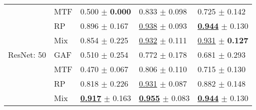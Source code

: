 \begin{tabular}[t]{lllll}
 & MTF & \textcolor[rgb]{0.9322033898,0.0677966102,0}{0.500} $\pm$ \textbf{\textcolor[rgb]{0.0000000000,0.5000000000,0}{0.000}} & \textcolor[rgb]{0.6654804270,0.3345195730,0}{0.833} $\pm$ \textcolor[rgb]{0.2351321773,0.5000000000,0}{0.098} & \textcolor[rgb]{0.8315789474,0.1684210526,0}{0.725} $\pm$ \textcolor[rgb]{0.0883980035,0.5000000000,0}{0.142} \\
 & RP & \textcolor[rgb]{0.0466101695,0.5000000000,0}{0.896} $\pm$ \textcolor[rgb]{0.6276652573,0.3723347427,0}{0.167} & \underline{\textcolor[rgb]{0.0913404508,0.5000000000,0}{0.938}} $\pm$ \textcolor[rgb]{0.1787248165,0.5000000000,0}{0.093} & \underline{\textbf{\textcolor[rgb]{0.0000000000,0.5000000000,0}{0.944}}} $\pm$ \textcolor[rgb]{0.0148524795,0.5000000000,0}{0.130} \\
 & Mix & \textcolor[rgb]{0.1398305085,0.5000000000,0}{0.854} $\pm$ \textcolor[rgb]{0.8452671150,0.1547328850,0}{0.225} & \underline{\textcolor[rgb]{0.1261368130,0.5000000000,0}{0.932}} $\pm$ \textcolor[rgb]{0.3579032134,0.5000000000,0}{0.111} & \underline{\textcolor[rgb]{0.0526315789,0.5000000000,0}{0.931}} $\pm$ \textbf{\textcolor[rgb]{0.0000000000,0.5000000000,0}{0.127}} \\
ResNet: 50 & GAF & \textcolor[rgb]{0.9104519774,0.0895480226,0}{0.510} $\pm$ \textcolor[rgb]{0.9520028121,0.0479971879,0}{0.254} & \textcolor[rgb]{1.0000000000,0.0000000000,0}{0.772} $\pm$ \textcolor[rgb]{1.0000000000,0.0000000000,0}{0.178} & \textcolor[rgb]{1.0000000000,0.0000000000,0}{0.681} $\pm$ \textcolor[rgb]{1.0000000000,0.0000000000,0}{0.293} \\
 & MTF & \textcolor[rgb]{1.0000000000,0.0000000000,0}{0.470} $\pm$ \textcolor[rgb]{0.2531848418,0.5000000000,0}{0.067} & \textcolor[rgb]{0.8177145117,0.1822854883,0}{0.806} $\pm$ \textcolor[rgb]{0.3482819482,0.5000000000,0}{0.110} & \textcolor[rgb]{0.8684210526,0.1315789474,0}{0.715} $\pm$ \textcolor[rgb]{0.0185218762,0.5000000000,0}{0.130} \\
 & RP & \textcolor[rgb]{0.2203389831,0.5000000000,0}{0.818} $\pm$ \textcolor[rgb]{0.8492077756,0.1507922244,0}{0.226} & \underline{\textcolor[rgb]{0.1304863582,0.5000000000,0}{0.931}} $\pm$ \textcolor[rgb]{0.1279698108,0.5000000000,0}{0.087} & \textcolor[rgb]{0.2368421053,0.5000000000,0}{0.882} $\pm$ \textcolor[rgb]{0.1280590346,0.5000000000,0}{0.148} \\
 & Mix & \underline{\textbf{\textcolor[rgb]{0.0000000000,0.5000000000,0}{0.917}}} $\pm$ \textcolor[rgb]{0.6114994881,0.3885005119,0}{0.163} & \underline{\textbf{\textcolor[rgb]{0.0000000000,0.5000000000,0}{0.955}}} $\pm$ \textcolor[rgb]{0.0859174230,0.5000000000,0}{0.083} & \underline{\textbf{\textcolor[rgb]{0.0000000000,0.5000000000,0}{0.944}}} $\pm$ \textcolor[rgb]{0.0148524795,0.5000000000,0}{0.130} \\
\bottomrule
\end{tabular}

